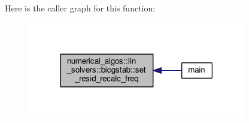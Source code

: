 Here is the caller graph for this function\-:
\nopagebreak
\begin{figure}[H]
\begin{center}
\leavevmode
\includegraphics[width=270pt]{classnumerical__algos_1_1lin__solvers_1_1bicgstab_a9f90b0901edd43e3c67d900688e436d3_icgraph}
\end{center}
\end{figure}


